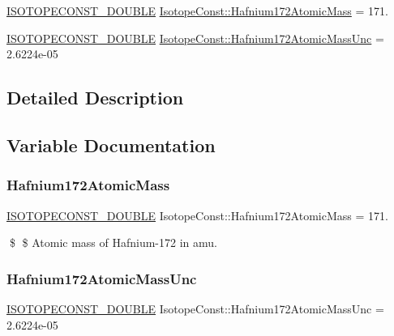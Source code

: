 \begin{DoxyCompactItemize}
\item 
\mbox{\hyperlink{group___isotope_const-_macros_ga8f45a7272ce02c0b4c65c44636ed719a}{I\+S\+O\+T\+O\+P\+E\+C\+O\+N\+S\+T\+\_\+\+D\+O\+U\+B\+LE}} \mbox{\hyperlink{group___isotope_const-_hafnium-_hf172_gaafc34dd9df1c35bc2dd23a3b5360de26}{Isotope\+Const\+::\+Hafnium172\+Atomic\+Mass}} = 171.
\item 
\mbox{\hyperlink{group___isotope_const-_macros_ga8f45a7272ce02c0b4c65c44636ed719a}{I\+S\+O\+T\+O\+P\+E\+C\+O\+N\+S\+T\+\_\+\+D\+O\+U\+B\+LE}} \mbox{\hyperlink{group___isotope_const-_hafnium-_hf172_gade703b2cd4666ea362b3d174cdab97ad}{Isotope\+Const\+::\+Hafnium172\+Atomic\+Mass\+Unc}} = 2.\+6224e-\/05
\end{DoxyCompactItemize}


\subsection{Detailed Description}


\subsection{Variable Documentation}
\mbox{\label{group___isotope_const-_hafnium-_hf172_gaafc34dd9df1c35bc2dd23a3b5360de26}} 
\subsubsection{\texorpdfstring{Hafnium172\+Atomic\+Mass}{Hafnium172AtomicMass}}
{\footnotesize\ttfamily \mbox{\hyperlink{group___isotope_const-_macros_ga8f45a7272ce02c0b4c65c44636ed719a}{I\+S\+O\+T\+O\+P\+E\+C\+O\+N\+S\+T\+\_\+\+D\+O\+U\+B\+LE}} Isotope\+Const\+::\+Hafnium172\+Atomic\+Mass = 171.}

\$ \$ Atomic mass of Hafnium-\/172 in amu. \mbox{\label{group___isotope_const-_hafnium-_hf172_gade703b2cd4666ea362b3d174cdab97ad}} 
\subsubsection{\texorpdfstring{Hafnium172\+Atomic\+Mass\+Unc}{Hafnium172AtomicMassUnc}}
{\footnotesize\ttfamily \mbox{\hyperlink{group___isotope_const-_macros_ga8f45a7272ce02c0b4c65c44636ed719a}{I\+S\+O\+T\+O\+P\+E\+C\+O\+N\+S\+T\+\_\+\+D\+O\+U\+B\+LE}} Isotope\+Const\+::\+Hafnium172\+Atomic\+Mass\+Unc = 2.\+6224e-\/05}

